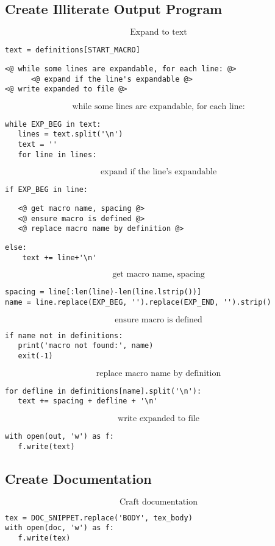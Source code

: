 \documentclass{article}
\begin{document}
\subsection{Create Illiterate Output Program}

$$\boxed{\text{Expand to text}}$${\color{YellowOrange}\begin{verbatim}text = definitions[START_MACRO]
\end{verbatim}}{\color{MidnightBlue}\begin{verbatim}<@ while some lines are expandable, for each line: @>
      <@ expand if the line's expandable @>
<@ write expanded to file @>
\end{verbatim}}$$\boxed{\text{while some lines are expandable, for each line:}}$${\color{YellowOrange}\begin{verbatim}while EXP_BEG in text:
   lines = text.split('\n')
   text = ''
   for line in lines:
\end{verbatim}}$$\boxed{\text{expand if the line's expandable}}$${\color{YellowOrange}\begin{verbatim}if EXP_BEG in line:
\end{verbatim}}{\color{MidnightBlue}\begin{verbatim}   <@ get macro name, spacing @>
   <@ ensure macro is defined @>
   <@ replace macro name by definition @>
\end{verbatim}}{\color{YellowOrange}\begin{verbatim}else:
    text += line+'\n'
\end{verbatim}}$$\boxed{\text{get macro name, spacing}}$${\color{YellowOrange}\begin{verbatim}spacing = line[:len(line)-len(line.lstrip())]
name = line.replace(EXP_BEG, '').replace(EXP_END, '').strip()
\end{verbatim}}$$\boxed{\text{ensure macro is defined}}$${\color{YellowOrange}\begin{verbatim}if name not in definitions:
   print('macro not found:', name)
   exit(-1)
\end{verbatim}}$$\boxed{\text{replace macro name by definition}}$${\color{YellowOrange}\begin{verbatim}for defline in definitions[name].split('\n'):
   text += spacing + defline + '\n'
\end{verbatim}}$$\boxed{\text{write expanded to file}}$${\color{YellowOrange}\begin{verbatim}with open(out, 'w') as f:
   f.write(text)
\end{verbatim}}\subsection{Create Documentation}

$$\boxed{\text{Craft documentation}}$${\color{YellowOrange}\begin{verbatim}tex = DOC_SNIPPET.replace('BODY', tex_body)
with open(doc, 'w') as f:
   f.write(tex)
\end{verbatim}}
\end{document}

